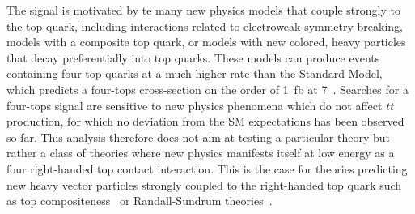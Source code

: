The signal is motivated by te many new physics models that couple strongly to the top quark, including interactions related to electroweak symmetry breaking, models with a composite top quark, or models with new colored, heavy particles that decay preferentially into top quarks.
These models can produce events containing four top-quarks at a much higher rate than the Standard Model, which predicts a four-tops cross-section on the order of 1~fb at 7~\TeV.
Searches for a four-tops signal are sensitive to new physics phenomena which do not affect $t\bar{t}$ production, for which no deviation from the SM expectations has been observed so far.
This analysis therefore does not aim at testing a particular theory but rather a class of theories where new physics manifests itself at low energy as a four right-handed top contact interaction. 
This is the case for theories predicting new heavy vector particles strongly coupled to the right-handed top quark such as top compositeness~\cite{PhysRevD.78.074026,1126-6708-2008-04-087,1126-6708-2009-05-022} or Randall-Sundrum theories~\cite{Guchait:2007jd}.




